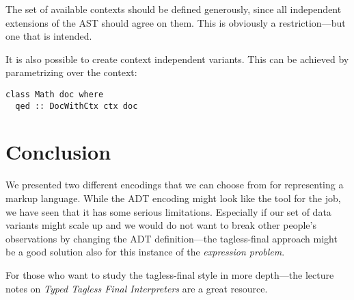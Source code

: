 The set of available contexts should be defined generously, since all
independent extensions of the AST should agree on them. This is obviously a
restriction—but one that is intended.

It is also possible to create context independent variants. This can be
achieved by parametrizing over the context:

\begin{lstlisting}
class Math doc where
  qed :: DocWithCtx ctx doc
\end{lstlisting}


\section{Conclusion}

We presented two different encodings that we can choose from for representing
a markup language. While the ADT encoding might look like the tool for the job,
we have seen that it has some serious limitations. Especially if our set of data
variants might scale up and we would do not want to break other people's
observations by changing the ADT definition—the tagless-final approach might be
a good solution also for this instance of the \emph{expression problem}.

For those who want to study the tagless-final style in more depth—the lecture
notes on \emph{Typed Tagless Final Interpreters} \cite{finally-tagless-tut} are
a great resource.
